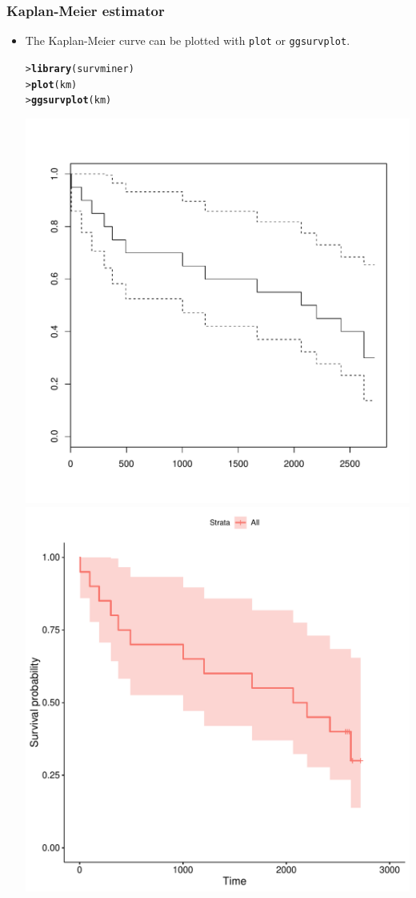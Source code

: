 \documentclass[10pt]{beamer}\usepackage[]{graphicx}\usepackage[]{color}
\makeatletter
\newcommand{\hlstd}[1]{\textcolor[rgb]{0.345,0.345,0.345}{#1}}%
\newcommand{\hlkwd}[1]{\textcolor[rgb]{0.737,0.353,0.396}{\textbf{#1}}}%
\newenvironment{kframe}{%
 \def\at@end@of@kframe{}%
 \ifinner\ifhmode%
  \def\at@end@of@kframe{\end{minipage}}%
  \begin{minipage}{\columnwidth}%
 \fi\fi%
 \def\FrameCommand##1{\hskip\@totalleftmargin \hskip-\fboxsep
 \colorbox{shadecolor}{##1}\hskip-\fboxsep
     \hskip-\linewidth \hskip-\@totalleftmargin \hskip\columnwidth}%
 \MakeFramed {\advance\hsize-\width
   \@totalleftmargin\z@ \linewidth\hsize
   \@setminipage}}%
 {\par\unskip\endMakeFramed%
 \at@end@of@kframe}
\newenvironment{knitrout}{}{} %
\renewenvironment{knitrout}{\setlength{\topsep}{-.2mm}}{}
\newcommand{\code}[1]{{\texttt{#1}}}
\makeatother
\begin{document}
\begin{frame}[fragile]
  \frametitle{Kaplan-Meier estimator}
  \begin{itemize}
  \item The Kaplan-Meier curve can be plotted with \code{plot} or \code{ggsurvplot}.
\begin{knitrout}\scriptsize
{}\color{fgcolor}\begin{kframe}
\begin{alltt}
\hlstd{> }\hlkwd{library}\hlstd{(survminer)}
\hlstd{> }\hlkwd{plot}\hlstd{(km)}
\hlstd{> }\hlkwd{ggsurvplot}\hlstd{(km)}
\end{alltt}
\end{kframe}
\end{knitrout}
    \includegraphics[scale = .28]{km1}\hspace{.2cm}
    \includegraphics[scale = .28]{km2}

\end{itemize}
\end{frame}
\end{document}
